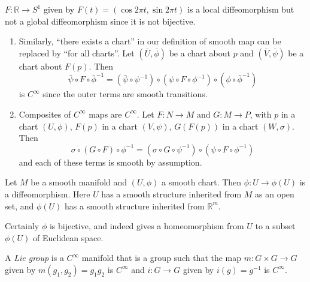 \begin{xmpl}
$F: \mathbb{R} \to S^1$ given by
$F(t) = (\cos 2 \pi t, \sin 2 \pi t)$ is a local diffeomorphism but
not a global diffeomorphism since it is not bijective.
\end{xmpl}

\begin{remark}
  \begin{enumerate}
    \item{
      Similarly, ``there exists a chart'' in our definition of smooth
      map can be replaced by ``for all charts''. Let
      $(\bar{U}, \bar{\phi})$ be a chart about $p$ and
      $(\bar{V}, \bar{\psi})$ be a chart about $F(p)$. Then
      $$
        \bar{\psi} \circ F \circ \bar{\phi}^{-1}
      = (\bar{\psi} \circ \psi^{-1})
        \circ
        (\psi \circ F \circ \phi^{-1})
        \circ
        (\phi \circ \bar{\phi}^{-1})
      $$
      is $C^\infty$ since the outer terms are smooth transitions.
    }
    \item{
      Composites of $C^\infty$ maps are $C^\infty$. Let
      $F: N \to M$ and $G: M \to P$, with
      $p$ in a chart $(U, \phi)$, $F(p)$ in a chart $(V, \psi)$,
      $G(F(p))$ in a chart $(W, \sigma)$. Then
      $$
        \sigma \circ (G \circ F) \circ \phi^{-1}
      = (\sigma \circ G \circ \psi^{-1})
        \circ
        (\psi \circ F \circ \phi^{-1})
      $$
      and each of these terms is smooth by assumption.
    }
  \end{enumerate}
\end{remark}

\begin{xmpl}
Let $M$ be a smooth manifold and $(U, \phi)$ a smooth chart. Then
$\phi: U \to \phi(U)$ is a diffeomorphism. Here $U$ has a smooth
structure inherited from $M$ as an open set, and $\phi(U)$ has a
smooth structure inherited from $\mathbb{R}^m$.

Certainly $\phi$ is bijective, and indeed gives a homeomorphism from
$U$ to a subset $\phi(U)$ of Euclidean space.
\end{xmpl}

\begin{defn}
A \emph{Lie group} is a $C^\infty$ manifold that is a group such that
the map
$m: G \times G \to G$ given by $m(g_1, g_2) = g_1 g_2$ is $C^\infty$
and $i: G \to G$ given by $i(g) = g^{-1}$ is $C^\infty$.
\end{defn}

